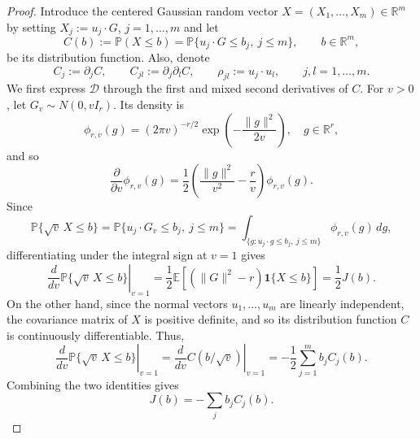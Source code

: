 \documentclass[11pt,letterpaper]{article}
\theoremstyle{remark}
\newcommand{\E}{\mathbb E}
\newcommand{\Pp}{\mathbb P}
\newcommand{\R}{\mathbb R}
\begin{document}
\begin{proof}
Introduce the centered Gaussian random vector $X=(X_1,\dots,X_m)\in\R^m$ by setting $X_j := u_j\cdot G$, $j=1,\dots,m$ and let
\[
 C(b):=\Pp(X\leq b) = \Pp\{u_j\cdot G\le b_j,\ j\le m\},\qquad b\in\R^m,
\]
be its distribution function. Also, denote
\[
 C_j:=\partial_jC,\qquad C_{jl}:=\partial_j\partial_lC,
 \qquad \rho_{jl}:=u_j\cdot u_l,\qquad j, l=1,\dots, m.
\]
We first express \(\mathcal D\) through the first and mixed second
derivatives of \(C\). For $v>0$, let \(G_v\sim N(0,vI_r)\). Its density is
\[
\phi_{r, v}(g)
=(2\pi v)^{-r/2}\exp\left(-\frac{\|g\|^2}{2v}\right),\quad g\in\R^r,
\]
and so
\[
\frac{\partial}{\partial v}\phi_{r, v}(g)
=\frac12\left(\frac{\|g\|^2}{v^2}-\frac rv\right)
\phi_{r, v}(g).
\]
Since
\[
\Pp\{\sqrt v\,X\le b\}=\Pp\{u_j\cdot G_v\le b_j,\ j\le m\}
=\int_{\{g:u_j\cdot g\le b_j,\ j\le m\}}
\phi_{r,v}(g)\,dg,
\]
differentiating under the integral sign at \(v=1\) gives
\[
\left.\frac{d}{dv}\Pp\{\sqrt v\,X\le b\}\right|_{v=1}
=\frac12\E\left[
(\|G\|^2-r)\mathbf 1\{X\le b\}
\right]
=\frac12J(b).
\]
On the other hand, since the normal vectors $u_1,\dots, u_m$ are linearly independent, the covariance matrix of $X$ is positive definite, and so its distribution function $C$ is continuously differentiable. Thus, 
\[
\left.\frac{d}{dv}\Pp\{\sqrt v\,X\le b\}\right|_{v=1} = \left.\frac{d}{dv}C(b/\sqrt v)\right|_{v=1}
=-\frac12\sum_{j=1}^m b_jC_j(b).
\]
Combining the two identities gives
\begin{equation}\label{appx-an:radial-trace}
J(b)=-\sum_{j} b_jC_j(b).
\end{equation}


\end{proof}
\end{document}
